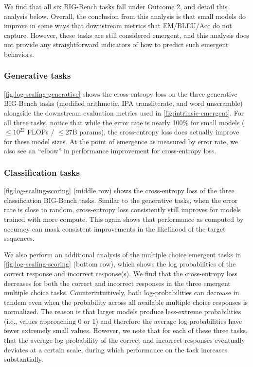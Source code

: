 We find that all six BIG-Bench tasks fall under Outcome 2, and detail this analysis below.
Overall, the conclusion from this analysis is that small models do improve in some ways that downstream metrics that EM/BLEU/Acc do not capture. However, these tasks are still considered emergent, and this analysis does not provide any straightforward indicators of how to predict such emergent behaviors. 



\subsubsection{Generative tasks}

\cref{fig:log-scaling-generative} shows the cross-entropy loss on the three generative BIG-Bench tasks (modified arithmetic, IPA transliterate, and word unscramble) alongside the downstream evaluation metrics used in \cref{fig:intrinsic-emergent}. 
For all three tasks, notice that while the error rate is nearly 100\% for small models (${\leq}10^{22}$ FLOPs / ${\leq}$27B params), the cross-entropy loss does actually improve for these model sizes.
At the point of emergence as measured by error rate, we also see an ``elbow'' in performance improvement for cross-entropy loss.

\subsubsection{Classification tasks}

\cref{fig:log-scaling-scoring} (middle row) shows the cross-entropy loss of the three classification BIG-Bench tasks.
Similar to the generative tasks, when the error rate is close to random, cross-entropy loss consistently still improves for models trained with more compute. 
This again shows that performance as computed by accuracy can mask consistent improvements in the likelihood of the target sequences.

We also perform an additional analysis of the multiple choice emergent tasks in \cref{fig:log-scaling-scoring} (bottom row), which shows the log probabilities of the correct response and incorrect response(s).
We find that the cross-entropy loss decreases for both the correct and incorrect responses in the three emergent multiple choice tasks.
Counterintuitively, both log-probabilities can decrease in tandem even when the probability across all available multiple choice responses is normalized.
The reason is that larger models produce less-extreme probabilities (i.e., values approaching 0 or 1) and therefore the average log-probabilities have fewer extremely small values.
However, we note that for each of these three tasks, that the average log-probability of the correct and incorrect responses eventually deviates at a certain scale, during which performance on the task increases substantially.

















